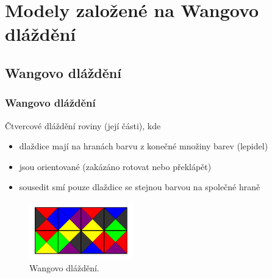 \documentclass[10pt]{beamer}
\theoremstyle{definition}
\theoremstyle{remark}
\begin{document}

\section{Modely založené na Wangovo dláždění}
\subsection{Wangovo dláždění}
\begin{frame}
\frametitle{Wangovo dláždění}
	Čtvercové dláždění roviny (její části), kde
	\begin{itemize}
		\item dlaždice mají na hranách barvu z konečné množiny barev (lepidel)
		\item jsou orientované (zakázáno rotovat nebo překlápět)
		\item sousedit smí pouze dlaždice se stejnou barvou na společné hraně
	\end{itemize}
	\begin{figure}[h]
	\begin{center}
		\includegraphics[width=0.4\textwidth]{../figures/wang_tiling/wang_tiling.pdf} %
		\caption{Wangovo dláždění.}
	\end{center}
	\end{figure}
\end{frame}
\end{document}
